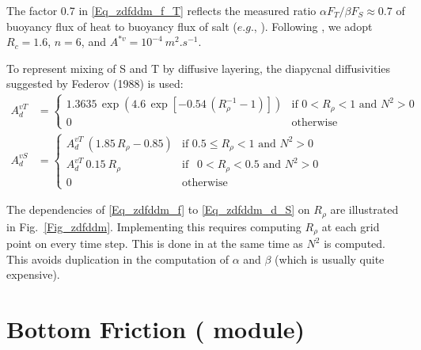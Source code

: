 The factor 0.7 in \eqref{Eq_zdfddm_f_T} reflects the measured ratio 
$\alpha F_T /\beta F_S \approx  0.7$ of buoyancy flux of heat to buoyancy 
flux of salt ($e.g.$, \citet{McDougall_Taylor_JMR84}). Following  \citet{Merryfield1999}, 
we adopt $R_c = 1.6$, $n = 6$, and $A^{\ast v} = 10^{-4}~m^2.s^{-1}$.

To represent mixing of S and T by diffusive layering,  the diapycnal diffusivities suggested by Federov (1988) is used: 
\begin{align} 	\label{Eq_zdfddm_d}
A_d^{vT} &= 	\begin{cases}
	1.3635 \, \exp{\left( 4.6\, \exp{ \left[  -0.54\,( R_{\rho}^{-1} - 1 )  \right] }    \right)}
									&\text{if  $0<R_\rho < 1$ and $N^2>0$ } \\
	0 								&\text{otherwise} 
				\end{cases}   
\\   			\label{Eq_zdfddm_d_S}
A_d^{vS} &= 	\begin{cases}
	A_d^{vT}\ \left( 1.85\,R_{\rho} - 0.85 \right)
									&\text{if  $0.5 \leq R_\rho<1$ and $N^2>0$ } \\
	A_d^{vT} \ 0.15 \ R_\rho
									&\text{if  $\ \ 0 < R_\rho<0.5$ and $N^2>0$ } \\
	0 								&\text{otherwise} 
				\end{cases}   
\end{align}

The dependencies of \eqref{Eq_zdfddm_f} to \eqref{Eq_zdfddm_d_S} on $R_\rho$ 
are illustrated in Fig.~\ref{Fig_zdfddm}. Implementing this requires computing 
$R_\rho$ at each grid point on every time step. This is done in  at the 
same time as $N^2$ is computed. This avoids duplication in the computation of 
$\alpha$ and $\beta$ (which is usually quite expensive).

\section  [Bottom and top Friction (\textit{zdfbfr})]   {Bottom Friction ( module)}
\label{ZDF_bfr}


